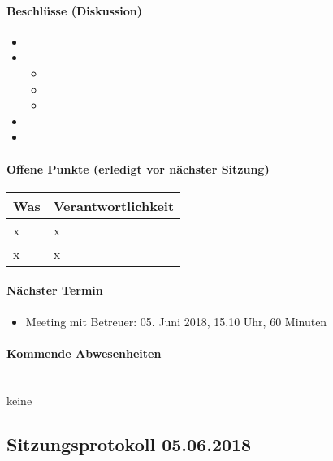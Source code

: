 \paragraph{Beschlüsse (Diskussion)}
\begin{itemize}	
	\item 
	\item 
	\begin{itemize}
		\item 
		\item 
		\item 
	\end{itemize}
	\item 
	\item 
\end{itemize}

\paragraph{Offene Punkte (erledigt vor nächster Sitzung)} \mbox{}

\begin{table}[H]
	\centering
	\begin{tabularx}{\textwidth}{X | p{4.5cm}}
		\rowcolor{gray!50}
		\textbf{Was} & \textbf{Verantwortlichkeit} \\
		\hline
		x & x \\
		x & x \\
	\end{tabularx}
	\label{tab:my-label}
\end{table}

\paragraph{Nächster Termin}
\begin{itemize}	
	\item Meeting mit Betreuer: 05. Juni 2018, 15.10 Uhr, 60 Minuten
\end{itemize}

\paragraph{Kommende Abwesenheiten} \mbox{}\\
keine


\newpage


\subsection{Sitzungsprotokoll 05.06.2018}

